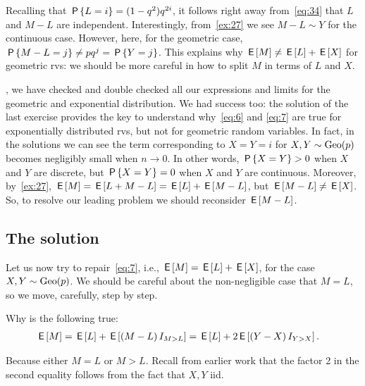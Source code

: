 Recalling that $\P{L=i} = (1-q^2)q^{2i}$, it follows right away from~\cref{eq:34} that $L$  and $M-L$ are independent.
Interestingly, from~\cref{ex:27} we see $M-L\sim Y$ for the continuous case. However, here, for the geometric case, $\P{M-L=j} \neq pq^{j} = \P{Y=j}$.  This explains why $\E M \neq \E L + \E X$ for geometric rvs: we should be more careful in how to split $M$ in terms of $L$ and $X$.



, we have checked and double checked all our expressions and limits for the geometric and exponential distribution.
We had success too: the solution of the last exercise provides the key to understand why~\eqref{eq:6} and \eqref{eq:7} are true for exponentially distributed rvs, but not for geometric random variables.
In fact, in the solutions we can see the term corresponding to $X=Y=i$ for $X,Y\sim \Geo{p}$ becomes negligibly small when $n\to 0$.
In other words, $\P{X=Y}>0$  when $X$ and $Y$ are discrete, but $\P{X=Y}=0$ when  $X$ and $Y$ are continuous.
Moreover, by~\cref{ex:27}, $\E M = \E{L + M-L} = \E L + \E{M-L}$, but $\E{M-L} \neq \E X$. So, to resolve our leading problem we should reconsider $\E{M-L}$.


\subsection{The solution}
\label{sec:solution}


Let us now try to repair~\cref{eq:7}, i.e., $\E M = \E L + \E X$,  for the case $X,Y\sim\Geo{p}$. We should be careful about the non-negligible case that $M=L$, so we move, carefully, step by step.

\begin{exercise}
Why is the following true:
\begin{align}
  \label{eq:40}
\E M &= \E L + \E{(M-L) \1{M>L}}  = \E L + 2\E{(Y-X) \1{Y>X}}.
\end{align}
\begin{solution}
Because either $M=L$ or $M>L$. Recall from earlier work that the factor 2 in the second equality follows from the fact that $X,Y$ iid.
\end{solution}
\end{exercise}


